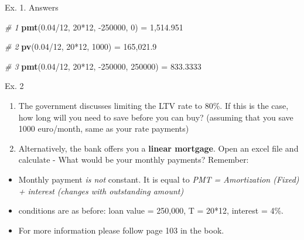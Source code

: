\documentclass[ignorenonframetext,]{beamer}
\newenvironment{Shaded}{\begin{snugshade}}{\end{snugshade}}
\newcommand{\KeywordTok}[1]{\textcolor[rgb]{0.13,0.29,0.53}{\textbf{{#1}}}}
\newcommand{\DecValTok}[1]{\textcolor[rgb]{0.00,0.00,0.81}{{#1}}}
\newcommand{\FloatTok}[1]{\textcolor[rgb]{0.00,0.00,0.81}{{#1}}}
\newcommand{\StringTok}[1]{\textcolor[rgb]{0.31,0.60,0.02}{{#1}}}
\newcommand{\CommentTok}[1]{\textcolor[rgb]{0.56,0.35,0.01}{\textit{{#1}}}}
\newcommand{\NormalTok}[1]{{#1}}
\providecommand{\tightlist}{%
\setlength{\itemsep}{0pt}\setlength{\parskip}{0pt}}
\begin{document}
\begin{frame}[fragile]{Ex. 1. Answers}

\begin{Shaded}
\begin{Highlighting}[]
\CommentTok{# 1 }
\KeywordTok{pmt}\NormalTok{(}\FloatTok{0.04}\NormalTok{/}\DecValTok{12}\NormalTok{, }\DecValTok{20}\NormalTok{*}\DecValTok{12}\NormalTok{, -}\DecValTok{250000}\NormalTok{, }\DecValTok{0}\NormalTok{)}
\NormalTok{=}\StringTok{ }\DecValTok{1}\NormalTok{,}\FloatTok{514.951}

\CommentTok{# 2}
\KeywordTok{pv}\NormalTok{(}\FloatTok{0.04}\NormalTok{/}\DecValTok{12}\NormalTok{, }\DecValTok{20}\NormalTok{*}\DecValTok{12}\NormalTok{, }\DecValTok{1000}\NormalTok{)}
\NormalTok{=}\StringTok{ }\DecValTok{165}\NormalTok{,}\FloatTok{021.9}

\CommentTok{# 3}
\KeywordTok{pmt}\NormalTok{(}\FloatTok{0.04}\NormalTok{/}\DecValTok{12}\NormalTok{, }\DecValTok{20}\NormalTok{*}\DecValTok{12}\NormalTok{, -}\DecValTok{250000}\NormalTok{, }\DecValTok{250000}\NormalTok{)}
\NormalTok{=}\StringTok{ }\FloatTok{833.3333}
\end{Highlighting}
\end{Shaded}

\end{frame}

\begin{frame}{Ex. 2}

\begin{enumerate}
\def\labelenumi{\arabic{enumi}.}
\item
  The government discusses limiting the LTV rate to 80\%. If this is the
  case, how long will you need to save before you can buy? (assuming
  that you save 1000 euro/month, same as your rate payments)
\item
  Alternatively, the bank offers you a \textbf{linear mortgage}. Open an
  excel file and calculate - What would be your monthly payments?
  Remember:
\end{enumerate}

\begin{itemize}
\tightlist
\item
  Monthly payment \emph{is not} constant. It is equal to \emph{PMT =
  Amortization (Fixed) + interest (changes with outstanding amount)}
\item
  conditions are as before: loan value = 250,000, T = 20*12, interest =
  4\%.
\item
  For more information please follow page 103 in the book.
\end{itemize}

\end{frame}
\end{document}
